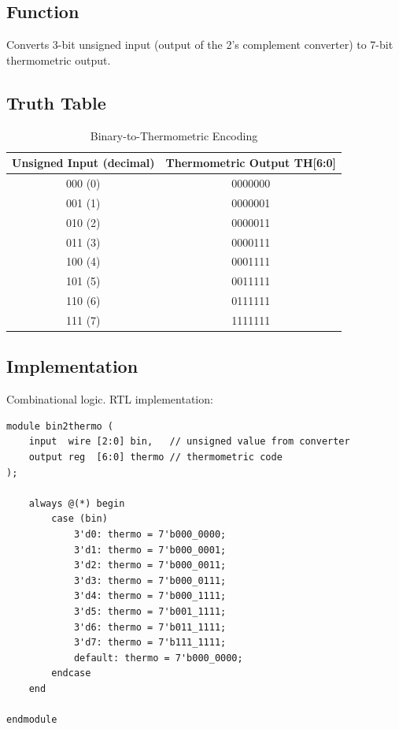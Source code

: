 \documentclass[11pt,a4paper]{article}
\begin{document}
\subsection{Function}

Converts 3-bit unsigned input (output of the 2's complement converter) to 7-bit thermometric output.

\subsection{Truth Table}

\begin{table}[h]
\centering
\begin{tabular}{@{}cc@{}}
\toprule
\textbf{Unsigned Input (decimal)} & \textbf{Thermometric Output TH[6:0]} \\
\midrule
000 (0) & 0000000 \\
001 (1) & 0000001 \\
010 (2) & 0000011 \\
011 (3) & 0000111 \\
100 (4) & 0001111 \\
101 (5) & 0011111 \\
110 (6) & 0111111 \\
111 (7) & 1111111 \\
\bottomrule
\end{tabular}
\caption{Binary-to-Thermometric Encoding}
\end{table}

\subsection{Implementation}

Combinational logic. RTL implementation:

\begin{lstlisting}[caption={Binary-to-Thermometric Encoder}]
module bin2thermo (
    input  wire [2:0] bin,   // unsigned value from converter
    output reg  [6:0] thermo // thermometric code
);

    always @(*) begin
        case (bin)
            3'd0: thermo = 7'b000_0000;
            3'd1: thermo = 7'b000_0001;
            3'd2: thermo = 7'b000_0011;
            3'd3: thermo = 7'b000_0111;
            3'd4: thermo = 7'b000_1111;
            3'd5: thermo = 7'b001_1111;
            3'd6: thermo = 7'b011_1111;
            3'd7: thermo = 7'b111_1111;
            default: thermo = 7'b000_0000;
        endcase
    end

endmodule
\end{lstlisting}
\end{document}
